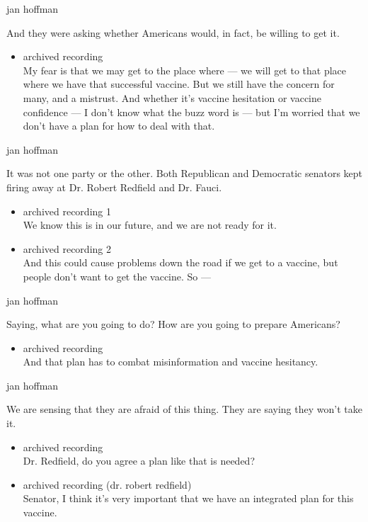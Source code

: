 jan hoffman

And they were asking whether Americans would, in fact, be willing to get
it.

\begin{itemize}
\tightlist
\item
  archived recording\\
  My fear is that we may get to the place where --- we will get to that
  place where we have that successful vaccine. But we still have the
  concern for many, and a mistrust. And whether it's vaccine hesitation
  or vaccine confidence --- I don't know what the buzz word is --- but
  I'm worried that we don't have a plan for how to deal with that.
\end{itemize}

jan hoffman

It was not one party or the other. Both Republican and Democratic
senators kept firing away at Dr. Robert Redfield and Dr. Fauci.

\begin{itemize}
\item
  archived recording 1\\
  We know this is in our future, and we are not ready for it.
\item
  archived recording 2\\
  And this could cause problems down the road if we get to a vaccine,
  but people don't want to get the vaccine. So ---
\end{itemize}

jan hoffman

Saying, what are you going to do? How are you going to prepare
Americans?

\begin{itemize}
\tightlist
\item
  archived recording\\
  And that plan has to combat misinformation and vaccine hesitancy.
\end{itemize}

jan hoffman

We are sensing that they are afraid of this thing. They are saying they
won't take it.

\begin{itemize}
\item
  archived recording\\
  Dr. Redfield, do you agree a plan like that is needed?
\item
  archived recording (dr. robert redfield)\\
  Senator, I think it's very important that we have an integrated plan
  for this vaccine.
\end{itemize}

